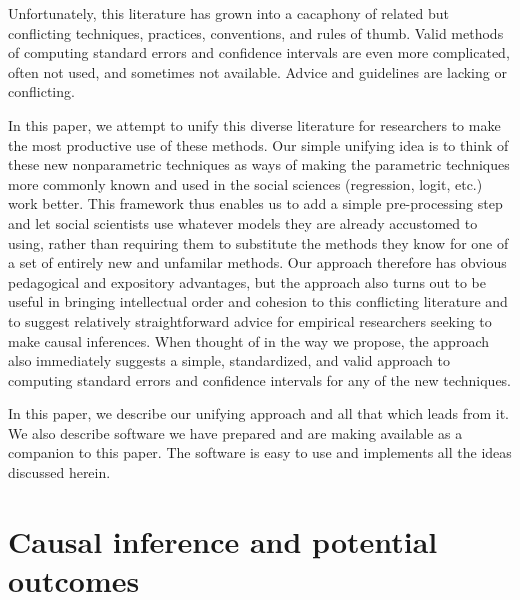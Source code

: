 \documentclass[11pt,titlepage]{article}
\begin{document}
Unfortunately, this literature has grown into a cacaphony of related but
conflicting techniques, practices, conventions, and rules of thumb.
Valid methods of computing standard errors and confidence intervals are
even more complicated, often not used, and sometimes not available.
Advice and guidelines are lacking or conflicting.
                                                                                                                                                             
In this paper, we attempt to unify this diverse literature for
researchers to make the most productive use of these methods.  Our
simple unifying idea is to think of these new nonparametric techniques
as ways of making the parametric techniques more commonly known and
used in the social sciences (regression, logit, etc.) work better.
This framework thus enables us to add a simple pre-processing step and
let social scientists use whatever models they are already accustomed
to using, rather than requiring them to substitute the methods they
know for one of a set of entirely new and unfamilar methods.  Our
approach therefore has obvious pedagogical and expository advantages,
but the approach also turns out to be useful in bringing intellectual
order and cohesion to this conflicting literature and to suggest
relatively straightforward advice for empirical researchers seeking to
make causal inferences.  When thought of in the way we propose, the
approach also immediately suggests a simple, standardized, and valid
approach to computing standard errors and confidence intervals for any
of the new techniques.
                                                                                                                                                             
In this paper, we describe our unifying approach and all that which leads
from it.  We also describe software we have prepared and are making
available as a companion to this paper.  The software is easy to use and
implements all the ideas discussed herein.
                                                                                                                                                             
\section{Causal inference and potential outcomes}
\end{document}
